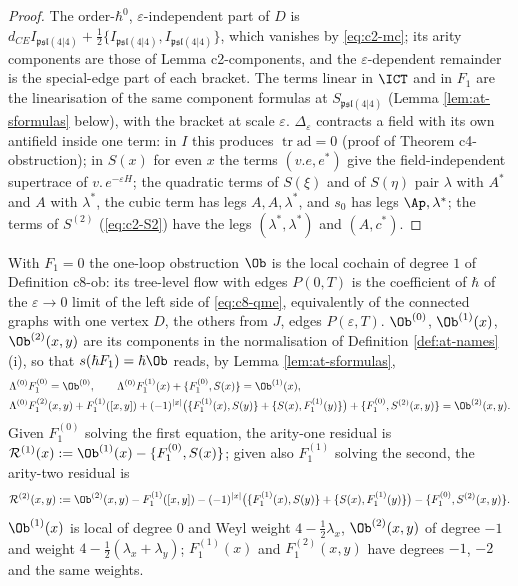 \begin{proof}
The order-$\hbar^0$, $\varepsilon$-independent part of $D$ is $d_{CE}I_{\mathfrak{psl}(4|4)}+\tfrac12\{I_{\mathfrak{psl}(4|4)},I_{\mathfrak{psl}(4|4)}\}$, which vanishes by \eqref{eq:c2-mc}; its arity components are those of Lemma c2-components, and the $\varepsilon$-dependent remainder is the special-edge part of each bracket. The terms linear in $\ICT$ and in $F_1$ are the linearisation of the same component formulas at $S_{\mathfrak{psl}(4|4)}$ (Lemma \ref{lem:at-sformulas} below), with the bracket at scale $\varepsilon$. $\Delta_\varepsilon$ contracts a field with its own antifield inside one term: in $I$ this produces $\operatorname{tr}\mathrm{ad}=0$ (proof of Theorem c4-obstruction); in $S(x)$ for even $x$ the terms $(v.e,e^*)$ give the field-independent supertrace of $v.\,e^{-\varepsilon H}$; the quadratic terms of $S(\xi)$ and of $S(\eta)$ pair $\lambda$ with $A^*$ and $A$ with $\lambda^*$, the cubic term has legs $A,A,\lambda^*$, and $s_0$ has legs $\Ap,\lambda^*$; the terms of $S^{(2)}$ (\eqref{eq:c2-S2}) have the legs $(\lambda^*,\lambda^*)$ and $(A,c^*)$.
\end{proof}

\begin{definition}
\label{def:at-ob}
With $F_1=0$ the one-loop obstruction $\Ob$ is the local cochain of degree $1$ of Definition c8-ob: its tree-level flow with edges $P(0,T)$ is the coefficient of $\hbar$ of the $\varepsilon\to0$ limit of the left side of \eqref{eq:c8-qme}, equivalently of the connected graphs with one vertex $D$, the others from $J$, edges $P(\varepsilon,T)$. $\Ob^{(0)}$, $\Ob^{(1)}(x)$, $\Ob^{(2)}(x,y)$ are its components in the normalisation of Definition \ref{def:at-names} (i), so that $s(\hbar F_1)=\hbar\Ob$ reads, by Lemma \ref{lem:at-sformulas},
\begin{equation}
\begin{aligned}
&\Lambda^{(0)}F_1^{(0)}=\Ob^{(0)},\qquad \Lambda^{(0)}F_1^{(1)}(x)+\{F_1^{(0)},S(x)\}=\Ob^{(1)}(x),\\
&\Lambda^{(0)}F_1^{(2)}(x,y)+F_1^{(1)}([x,y])+(-1)^{|x|}\big(\{F_1^{(1)}(x),S(y)\}+\{S(x),F_1^{(1)}(y)\}\big)+\{F_1^{(0)},S^{(2)}(x,y)\}=\Ob^{(2)}(x,y).
\end{aligned}
\label{eq:at-eqs}
\end{equation}
Given $F_1^{(0)}$ solving the first equation, the arity-one residual is $\mathcal R^{(1)}(x):=\Ob^{(1)}(x)-\{F_1^{(0)},S(x)\}$; given also $F_1^{(1)}$ solving the second, the arity-two residual is
\[
\mathcal R^{(2)}(x,y):=\Ob^{(2)}(x,y)-F_1^{(1)}([x,y])-(-1)^{|x|}\big(\{F_1^{(1)}(x),S(y)\}+\{S(x),F_1^{(1)}(y)\}\big)-\{F_1^{(0)},S^{(2)}(x,y)\}.
\]
$\Ob^{(1)}(x)$ is local of degree $0$ and Weyl weight $4-\tfrac12\lambda_x$, $\Ob^{(2)}(x,y)$ of degree $-1$ and weight $4-\tfrac12(\lambda_x+\lambda_y)$; $F_1^{(1)}(x)$ and $F_1^{(2)}(x,y)$ have degrees $-1$, $-2$ and the same weights.
\end{definition}

